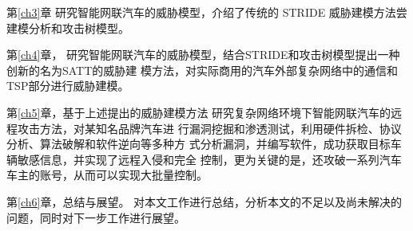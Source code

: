 第\ref{ch3}章
研究智能网联汽车的威胁模型，介绍了传统的 STRIDE 威胁建模方法尝建模分析和攻击树模型。

第\ref{ch4}章，
研究智能网联汽车的威胁模型，结合STRIDE和攻击树模型提出一种创新的名为SATT的威胁建
模方法，对实际商用的汽车外部复杂网络中的通信和TSP部分进行威胁建模。

第\ref{ch5}章，基于上述提出的威胁建模方法
研究复杂网络环境下智能网联汽车的远程攻击方法，对某知名品牌汽车进
行漏洞挖掘和渗透测试，利用硬件拆检、协议分析、算法破解和软件逆向等多种方
式分析漏洞，并编写软件，成功获取目标车辆敏感信息，并实现了远程入侵和完全
控制，更为关键的是，还攻破一系列汽车车主的账号，从而可以实现大批量控制。

第\ref{ch6}章，总结与展望。
对本文工作进行总结，分析本文的不足以及尚未解决的问题，同时对下一步工作进行展望。

